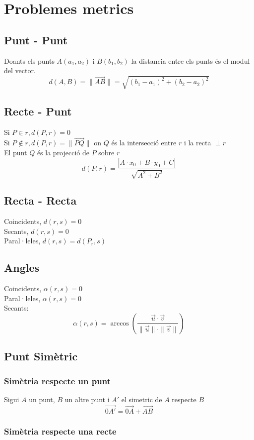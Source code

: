 \documentclass[12pt,a4paper]{article}
\newcommand{\module}[1]{\|#1\|}
\begin{document}
\section{Problemes metrics}
\subsection{Punt - Punt}
Doants els punts $A ( a_1, a_2)$ i $B(b_1, b_2)$ la distancia entre els punts és el modul del vector.
$$d(A, B) = \module{\vec{AB}}
=\sqrt{\left(b_1-a_1\right)^2+\left(b_2-a_2\right)^2}$$
\subsection{Recte - Punt}
Si $P \in r, d(P, r) = 0$\\
Si $P \notin r, d(P, r) = \module{\vec{PQ}}$ on $Q$ és la intersecció entre $r$ i la recta $\perp r$\\
El punt $Q$ és la projecció de $P$ sobre $r$
$$d(P, r)= \frac{|A\cdot x_0+B\cdot y_0+C|}{\sqrt{A^2+B^2}}$$
\subsection{Recta - Recta}
Coincidents, $d(r, s) = 0$\\
Secants, $d(r, s) = 0$\\
Paral·leles, $d(r, s) = d(P_r, s)$
\subsection{Angles}
Coincidents, $\alpha (r, s) = 0$\\
Paral·leles, $\alpha (r, s) = 0$\\
Secants: $$\alpha (r,s) = \arccos \left( \frac{\vec{u}\cdot \vec{v}}{\module{\vec{u}}\cdot\module{\vec{v}}} \right)$$

\subsection{Punt Simètric}
\subsubsection{Simètria respecte un punt}

Sigui $A$ un punt, $B$ un altre punt i $A'$ el simetric de $A$ respecte $B$
$$\vec{0A'} = \vec{0A} + \vec{AB}$$

\subsubsection{Simètria respecte una recte}
\end{document}
